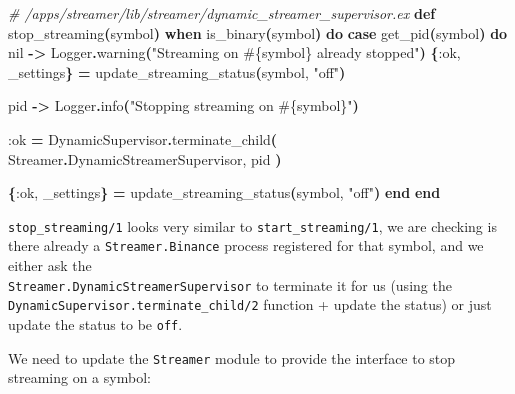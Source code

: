 \documentclass[
  oneside]{book}
\newenvironment{Shaded}{\begin{snugshade}}{\end{snugshade}}
\newcommand{\CommentTok}[1]{\textcolor[rgb]{0.56,0.35,0.01}{\textit{#1}}}
\newcommand{\ConstantTok}[1]{\textcolor[rgb]{0.56,0.35,0.01}{#1}}
\newcommand{\FunctionTok}[1]{\textcolor[rgb]{0.13,0.29,0.53}{\textbf{#1}}}
\newcommand{\KeywordTok}[1]{\textcolor[rgb]{0.13,0.29,0.53}{\textbf{#1}}}
\newcommand{\NormalTok}[1]{#1}
\newcommand{\OperatorTok}[1]{\textcolor[rgb]{0.81,0.36,0.00}{\textbf{#1}}}
\newcommand{\OtherTok}[1]{\textcolor[rgb]{0.56,0.35,0.01}{#1}}
\newcommand{\StringTok}[1]{\textcolor[rgb]{0.31,0.60,0.02}{#1}}
\newcommand{\VariableTok}[1]{\textcolor[rgb]{0.00,0.00,0.00}{#1}}
\begin{document}
\begin{Shaded}
\begin{Highlighting}[]
  \CommentTok{\# /apps/streamer/lib/streamer/dynamic\_streamer\_supervisor.ex}
  \KeywordTok{def}\NormalTok{ stop\_streaming}\FunctionTok{(}\NormalTok{symbol}\FunctionTok{)} \KeywordTok{when}\NormalTok{ is\_binary}\FunctionTok{(}\NormalTok{symbol}\FunctionTok{)} \KeywordTok{do}
    \KeywordTok{case}\NormalTok{ get\_pid}\FunctionTok{(}\NormalTok{symbol}\FunctionTok{)} \KeywordTok{do}
      \ConstantTok{nil} \OperatorTok{{-}\textgreater{}}
        \ConstantTok{Logger}\OperatorTok{.}\NormalTok{warning}\FunctionTok{(}\StringTok{"Streaming on }\OtherTok{\#\{}\NormalTok{symbol}\OtherTok{\}}\StringTok{ already stopped"}\FunctionTok{)}
        \FunctionTok{\{}\VariableTok{:ok}\NormalTok{, \_settings}\FunctionTok{\}} \OperatorTok{=}\NormalTok{ update\_streaming\_status}\FunctionTok{(}\NormalTok{symbol, }\StringTok{"off"}\FunctionTok{)}

\NormalTok{      pid }\OperatorTok{{-}\textgreater{}}
        \ConstantTok{Logger}\OperatorTok{.}\NormalTok{info}\FunctionTok{(}\StringTok{"Stopping streaming on }\OtherTok{\#\{}\NormalTok{symbol}\OtherTok{\}}\StringTok{"}\FunctionTok{)}

        \VariableTok{:ok} \OperatorTok{=}
          \ConstantTok{DynamicSupervisor}\OperatorTok{.}\NormalTok{terminate\_child}\FunctionTok{(}
            \ConstantTok{Streamer}\OperatorTok{.}\ConstantTok{DynamicStreamerSupervisor}\NormalTok{,}
\NormalTok{            pid}
          \FunctionTok{)}

        \FunctionTok{\{}\VariableTok{:ok}\NormalTok{, \_settings}\FunctionTok{\}} \OperatorTok{=}\NormalTok{ update\_streaming\_status}\FunctionTok{(}\NormalTok{symbol, }\StringTok{"off"}\FunctionTok{)}
    \KeywordTok{end}
  \KeywordTok{end}
\end{Highlighting}
\end{Shaded}

\texttt{stop\_streaming/1} looks very similar to \texttt{start\_streaming/1}, we are checking is there already a \texttt{Streamer.Binance} process registered for that symbol, and we either ask the\\
\texttt{Streamer.DynamicStreamerSupervisor} to terminate it for us (using the\\
\texttt{DynamicSupervisor.terminate\_child/2} function + update the status) or just update the status to be \texttt{off}.

We need to update the \texttt{Streamer} module to provide the interface to stop streaming on a symbol:
\end{document}
